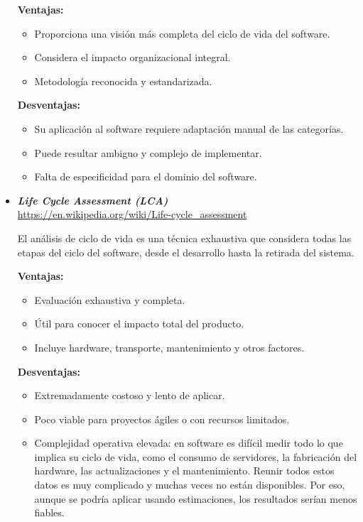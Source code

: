\documentclass[12pt,a4paper]{report}
\begin{document}
\begin{itemize}
        \textbf{Ventajas:}
        \begin{itemize}
          \item Proporciona una visión más completa del ciclo de vida del software.
          \item Considera el impacto organizacional integral.
          \item Metodología reconocida y estandarizada.
        \end{itemize}
        \textbf{Desventajas:}
        \begin{itemize}
          \item Su aplicación al software requiere adaptación manual de las categorías.
          \item Puede resultar ambiguo y complejo de implementar.
          \item Falta de especificidad para el dominio del software.
        \end{itemize}

        \vspace{0.8em}

  \item \textit{\textbf{Life Cycle Assessment (LCA)}} \\
        \url{https://en.wikipedia.org/wiki/Life-cycle_assessment}

        El análisis de ciclo de vida es una técnica exhaustiva que considera todas las etapas del ciclo del software, desde el desarrollo hasta la retirada del sistema.

        \textbf{Ventajas:}
        \begin{itemize}
          \item Evaluación exhaustiva y completa.
          \item Útil para conocer el impacto total del producto.
          \item Incluye hardware, transporte, mantenimiento y otros factores.
        \end{itemize}
        \textbf{Desventajas:}
        \begin{itemize}
          \item Extremadamente costoso y lento de aplicar.
          \item Poco viable para proyectos ágiles o con recursos limitados.
          \item Complejidad operativa elevada: en software es difícil medir todo lo que implica su ciclo de vida, como el consumo de servidores, la fabricación del hardware, las actualizaciones y el mantenimiento. Reunir todos estos datos es muy complicado y muchas veces no están disponibles. Por eso, aunque se podría aplicar usando estimaciones, los resultados serían menos fiables.
        \end{itemize}


\end{itemize}
\end{document}
